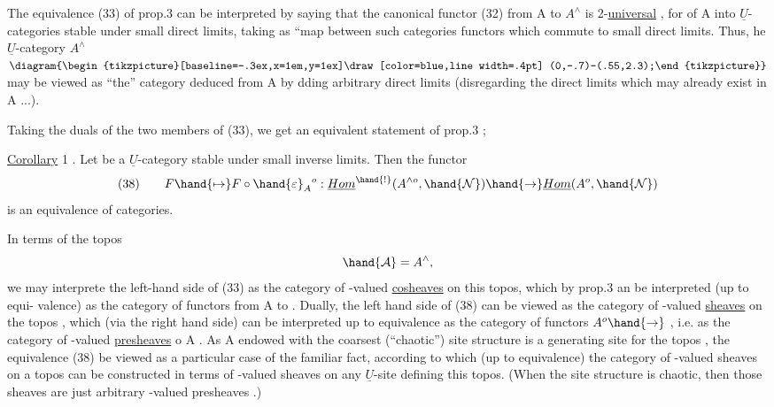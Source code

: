
The equivalence (33) of prop.3 can be interpreted by saying that the
 canonical functor (32) from A to $A^{\wedge}$ is 2-\uline{universal} , for  
of A into $\underline{U}$-categories stable under small direct limits, taking as ``map
between such categories functors which commute to small direct limits.
Thus, he $\underline{U}$-category $A^{\wedge}$\ensuremath{\diagram{\begin{tikzpicture}[baseline=-.3ex,x=1em,y=1ex]\draw[color=blue,line width=.4pt] (0,-.7)--(.55,2.3);\end{tikzpicture}}} may be viewed as  ``the'' category deduced from
A by dding arbitrary direct limits (disregarding the direct limits which
may  already exist in A ...).

Taking the duals of the two members of (33), we get  an equivalent
statement of prop.3 ; 

\uline{Corollary} 1 . Let  be a $\underline{U}$-category stable under small inverse limits.
Then the functor
\[ (38) \qquad F \hand{\mapsto} F \circ \hand{\varepsilon}_A{}^{o} : \underline{Hom}^{\hand{!}}(A^{\wedge o}, \hand{\mathcal{N}}) \hand{\to} \underline{Hom}(A^{o}, \hand{\mathcal{N}}) \]
is an equivalence of categories.

In terms of the topos
\[ \hand{\mathcal{A}} = A^{\wedge} , \]
we may interprete the left-hand side of (33) as the category of -valued
\uline{cosheaves} on this topos, which by prop.3 an be interpreted (up to equi-%
valence) as the category of functors from A to . Dually, the left
hand side of (38) can be viewed as the category of -valued \uline{sheaves} on
the topos , which (via the right hand side) can be interpreted up to
equivalence as the category of functors $A^{o} \hand{\to}$ , i.e. as the category of
-valued \uline{presheaves} o A . As A endowed with the coarsest (``chaotic'')
site structure is a generating site for the topos , the equivalence (38)
 be viewed as a particular case of the familiar fact, according to
which (up to equivalence) the category of -valued sheaves on a topos
can be constructed in terms of -valued sheaves on any $\underline{U}$-site defining
this topos. (When the site structure is chaotic, then those sheaves are
just arbitrary -valued presheaves .)

